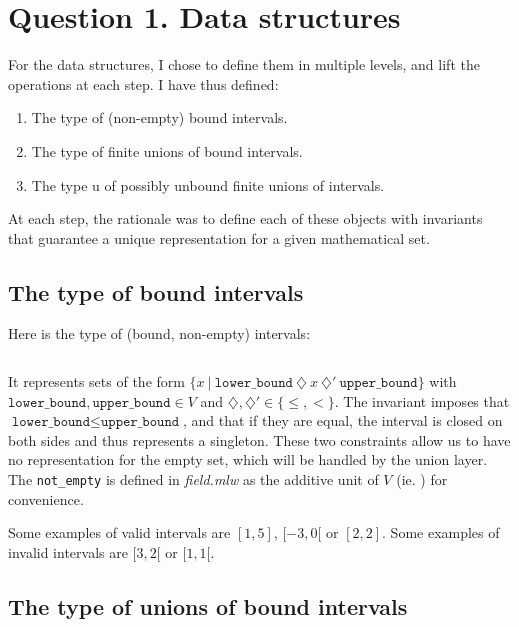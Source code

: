 \section{Question 1. Data structures}

For the data structures, I chose to define them in multiple levels, and lift the
operations at each step. I have thus defined:
%
\begin{enumerate}
  \item The type of (non-empty) bound intervals.
  \item The type of finite unions of bound intervals.
  \item The type u of possibly unbound finite unions of intervals.
\end{enumerate}
%
At each step, the rationale was to define each of these objects with invariants that
guarantee a unique representation for a given mathematical set.
%

\subsection{The type of bound intervals}
Here is the type of (bound, non-empty) intervals:
\inputminted{\whyml}{why3code/interval_type.mlw}
%
It represents sets of the form
$\{ x ~|~ \texttt{lower\_bound}~\diamondsuit~x~\diamondsuit'~\texttt{upper\_bound} \}$
with
$\texttt{lower\_bound}, \texttt{upper\_bound} \in V$ and
$\diamondsuit, \diamondsuit' \in \{ \le, < \}$.
%
The invariant imposes that $\texttt{lower\_bound} \le \texttt{upper\_bound}$,
%
and that if they are equal, the interval is closed on both sides and thus represents
a singleton. These two constraints allow us to have no representation for the empty
set, which will be handled by the union layer.
%
The \texttt{not_empty} is defined in \textit{field.mlw} as the additive
unit of $V$ (ie. ) for convenience.

Some examples of valid intervals are $[1, 5]$, $[-3, 0[$ or $[2,2]$. Some
examples of invalid intervals are $[3, 2[$ or $[1,1[$.


\subsection{The type of unions of bound intervals}

